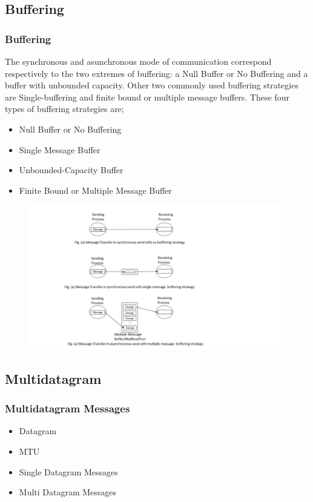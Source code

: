 \documentclass{beamer}
\begin{document}
\subsection{Buffering}
\begin{frame}[allowframebreaks]
	\frametitle{Buffering}
	The synchronous and asunchronous mode of communication correspond respectively to the
	two extremes of buffering: a Null Buffer or No Buffering and a buffer with unbounded
	capacity. Other two commonly used buffering strategies are Single-buffering and finite
	bound or multiple message buffers. These four types of buffering strategies are;
	\begin{itemize}
		\item Null Buffer or No Buffering
		\item Single Message Buffer
		\item Unbounded-Capacity Buffer
		\item Finite Bound or Multiple Message Buffer
	\end{itemize}
	\vspace{1.5cm}		
	\framebreak
	\begin{figure}
		\centering
		\includegraphics[width=15cm]{buffering.jpg}
	\end{figure}
	\vspace{1cm}
\end{frame}



\subsection{Multidatagram}
\begin{frame}
	\frametitle{Multidatagram Messages}
	\begin{itemize}
		\item Datagram
		\item MTU
		\item Single Datagram Messages
		\item Multi Datagram Messages
	\end{itemize}
	\vspace{4cm}
\end{frame}
\end{document}

